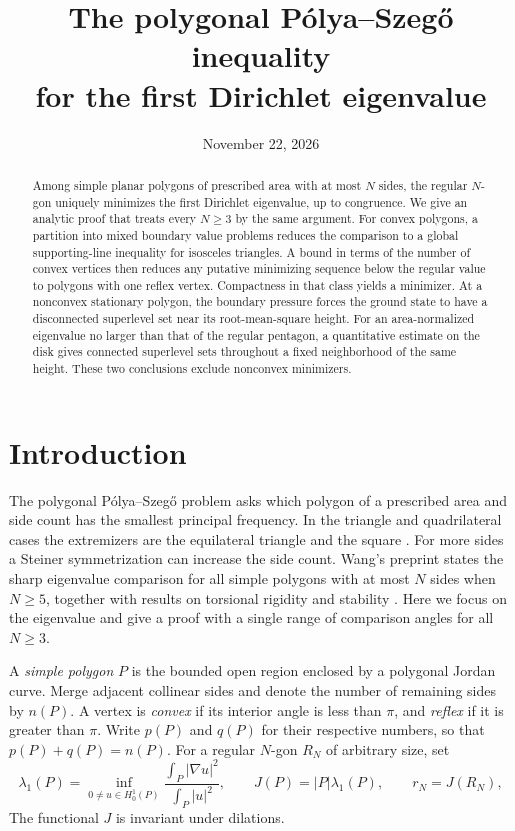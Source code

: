 \documentclass[11pt,a4paper,reqno]{amsart}
\title[The first Dirichlet eigenvalue of a polygon]{The polygonal P\'olya--Szeg\H{o} inequality\\ for the first Dirichlet eigenvalue}
\date{November 22, 2026}
\theoremstyle{remark}
\numberwithin{equation}{section}
\begin{document}
\begin{abstract}
Among simple planar polygons of prescribed area with at most $N$ sides, the regular
$N$-gon uniquely minimizes the first Dirichlet eigenvalue, up to congruence.
We give an analytic proof that treats every $N\ge3$ by the same argument.
For convex polygons, a partition into mixed boundary value problems reduces
the comparison to a global supporting-line inequality for isosceles triangles.
A bound in terms of the number of convex vertices then reduces any putative
minimizing sequence below the regular value to polygons with one reflex vertex.
Compactness in that class yields a minimizer. At a nonconvex stationary polygon,
the boundary pressure forces the ground state to have a disconnected superlevel
set near its root-mean-square height. For an area-normalized eigenvalue no larger than that of the regular pentagon,
a quantitative estimate on the disk gives connected superlevel sets throughout
a fixed neighborhood of the same height. These two conclusions exclude nonconvex minimizers.
\end{abstract}
\maketitle


\section{Introduction}\label{sec:main}

The polygonal P\'olya--Szeg\H{o} problem asks which polygon of a prescribed
area and side count has the smallest principal frequency. In the triangle and
quadrilateral cases the extremizers are the equilateral triangle and the square
\cite[pp.~158--159]{ps}. For more sides a Steiner symmetrization can increase the
side count. Wang's preprint states the sharp eigenvalue comparison for all
simple polygons with at most $N$ sides when $N\ge5$, together with results on
torsional rigidity and stability \cite[Theorem~1.1]{wang}. Here we focus on the
eigenvalue and give a proof with a single range of comparison angles for all
$N\ge3$.

A \emph{simple polygon} $P$ is the bounded open region enclosed by a polygonal
Jordan curve. Merge adjacent collinear sides and denote the number of remaining
sides by $n(P)$. A vertex is \emph{convex} if its interior angle is less than
$\pi$, and \emph{reflex} if it is greater than $\pi$. Write $p(P)$ and $q(P)$ for
their respective numbers, so that $p(P)+q(P)=n(P)$. For a regular $N$-gon
$R_N$ of arbitrary size, set
\[
 \lambda_1(P)=\inf_{0\ne u\in H_0^1(P)}
       \frac{\int_P |\nabla u|^2}{\int_P |u|^2},\qquad
 J(P)=|P|\lambda_1(P),\qquad r_N=J(R_N),
\]
The functional $J$ is invariant under dilations.
\end{document}
